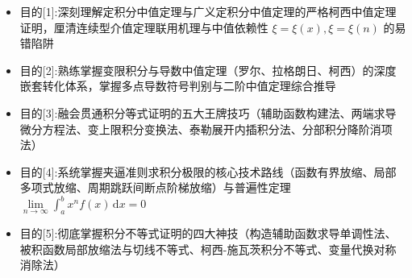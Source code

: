 \documentclass[11pt,a4paper,UTF8]{ctexart}
\begin{document}
\pagestyle{fancy}
\fancyhf{}
\fancyhead[R]{\small\color{TitlePurple}\nouppercase{\leftmark}}
\renewcommand{\headrulewidth}{0.5pt}

\tableofcontents
\newpage
{}


\begin{targetbox}[本章复习目标与核心知识图谱]
\begin{itemize}
  \item 目的[1]:深刻理解定积分中值定理与广义定积分中值定理的严格柯西中值定理证明，厘清连续型介值定理联用机理与中值依赖性 $\xi = \xi(x), \xi = \xi(n)$ 的易错陷阱
\end{itemize}
\end{targetbox}

\begin{targetbox}[本章复习目标与核心知识图谱]
\begin{itemize}
  \item 目的[2]:熟练掌握变限积分与导数中值定理（罗尔、拉格朗日、柯西）的深度嵌套转化体系，掌握多点导数符号判别与二阶中值定理综合推导
\end{itemize}
\end{targetbox}

\begin{targetbox}[本章复习目标与核心知识图谱]
\begin{itemize}
  \item 目的[3]:融会贯通积分等式证明的五大王牌技巧（辅助函数构建法、两端求导微分方程法、变上限积分变换法、泰勒展开内插积分法、分部积分降阶消项法）
\end{itemize}
\end{targetbox}

\begin{targetbox}[本章复习目标与核心知识图谱]
\begin{itemize}
  \item 目的[4]:系统掌握夹逼准则求积分极限的核心技术路线（函数有界放缩、局部多项式放缩、周期跳跃间断点阶梯放缩）与普遍性定理 $\lim\limits_{n\to\infty} \int_a^b x^n f(x)\,\mathrm{d}x = 0$
\end{itemize}
\end{targetbox}

\begin{targetbox}[本章复习目标与核心知识图谱]
\begin{itemize}
  \item 目的[5]:彻底掌握积分不等式证明的四大神技（构造辅助函数求导单调性法、被积函数局部放缩法与切线不等式、柯西-施瓦茨积分不等式、变量代换对称消除法）
\end{itemize}
\end{targetbox}
\end{document}

